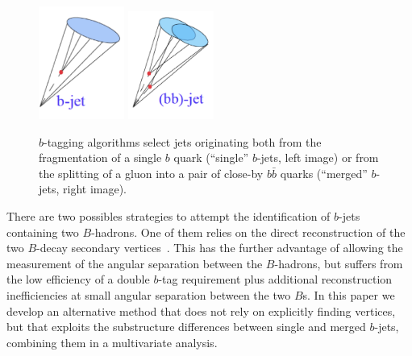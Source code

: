 \begin{figure}[h]
\centering
\includegraphics[width=0.25\textwidth]{FIGS/Single_b.png}
\hspace{1cm}
\includegraphics[width=0.25\textwidth]{FIGS/Merged_bb.png}
  \caption{$b$-tagging algorithms select jets originating both from the fragmentation of a single $b$ quark (``single'' $b$-jets, left image) or from the splitting of a gluon into a pair of close-by $b \bar{b}$ quarks (``merged'' $b$-jets, right image).}
  \label{fig:gbbcartoon}
\end{figure}

 There are two possibles strategies to attempt the identification of $b$-jets containing two $B$-hadrons. One of them relies on the direct reconstruction of the two $B$-decay secondary vertices~\cite{CDFAzimutalCorrelation}. This has the further advantage of allowing the measurement of the angular separation between the $B$-hadrons, but suffers from the low efficiency of a double $b$-tag requirement plus additional reconstruction inefficiencies at small angular separation between the two $B$s. In this paper we develop an alternative method that does not rely on explicitly finding vertices, but that exploits the substructure differences between single and merged $b$-jets, combining them in a multivariate analysis. 

